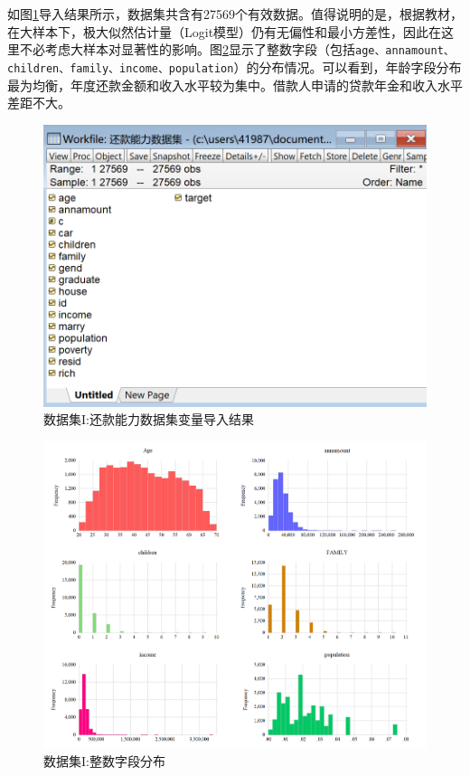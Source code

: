 \documentclass[13.5pt,hyperref,a4paper,UTF8]{ctexart}
\begin{document}
如图\ref{还款能力数据集变量情况}导入结果所示，数据集共含有27569个有效数据。值得说明的是，根据教材，在大样本下，极大似然估计量（Logit模型）仍有无偏性和最小方差性，因此在这里不必考虑大样本对显著性的影响。图\ref{整数字段分布}显示了整数字段（包括\texttt{age、annamount、children、family、income、population}）的分布情况。可以看到，年龄字段分布最为均衡，年度还款金额和收入水平较为集中。借款人申请的贷款年金和收入水平差距不大。

\begin{figure}[H]
    \centering
    \includegraphics[width =.6\textwidth]{figures/2DATABASE/还款能力数据集变量情况.png}
    \caption{数据集I:还款能力数据集变量导入结果}
    \label{还款能力数据集变量情况}
\end{figure}

\begin{figure}[H]
    \centering
    \includegraphics[width =.9\textwidth]{figures/2DATABASE/整数字段分布.png}
    \caption{数据集I:整数字段分布}
    \label{整数字段分布}
\end{figure}
\end{document}
